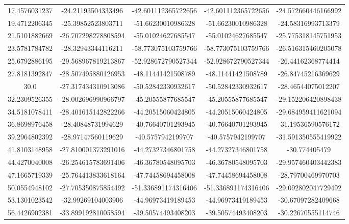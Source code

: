 \begin{table}[H]
\begin{tabular}{*{5}{S[table-auto-round, table-format=-2.2]}}
  17.4576031237 & -24.21193504333496 & -42.601112365722656 & -42.601112365722656 & -24.572660446166992 \tabularnewline

  19.4712206345 & -25.39852523803711 & -51.66230010986328 & -51.66230010986328 & -24.58316993713379 \tabularnewline

  21.5101882669 & -26.707298278808594 & -55.01024627685547 & -55.01024627685547 & -25.775318145751953 \tabularnewline

  23.5781784782 & -28.32943344116211 & -58.773075103759766 & -58.773075103759766 & -26.516315460205078 \tabularnewline

  25.6792886195 & -29.568967819213867 & -52.928672790527344 & -52.928672790527344 & -26.44162368774414 \tabularnewline

  27.8181392847 & -28.507495880126953 & -48.11441421508789 & -48.11441421508789 & -26.84745216369629 \tabularnewline

  30.0 & -27.317434310913086 & -50.52842330932617 & -50.52842330932617 & -28.46544075012207 \tabularnewline

  32.2309526355 & -28.002696990966797 & -45.20555877685547 & -45.20555877685547 & -29.152206420898438 \tabularnewline

  34.5181078411 & -28.401615142822266 & -44.20515060424805 & -44.20515060424805 & -29.684959411621094 \tabularnewline

  36.8698976458 & -28.40848731994629 & -40.76640701293945 & -40.76640701293945 & -31.19536590576172 \tabularnewline

  39.2964802392 & -28.97147560119629 & -40.5757942199707 & -40.5757942199707 & -31.591350555419922 \tabularnewline

  41.8103148958 & -27.810001373291016 & -44.27327346801758 & -44.27327346801758 & -30.774405479 \tabularnewline

  44.4270040008 & -26.254615783691406 & -46.36780548095703 & -46.36780548095703 & -29.957460403442383 \tabularnewline

  47.1665719339 & -25.764413833618164 & -47.74458694458008 & -47.74458694458008 & -28.79700469970703 \tabularnewline

  50.0554948102 & -27.705350875854492 & -51.336891174316406 & -51.336891174316406 & -29.092802047729492 \tabularnewline

  53.1301023542 & -32.99269104003906 & -44.96973419189453 & -44.96973419189453 & -30.67097282409668 \tabularnewline

  56.4426902381 & -33.899192810058594 & -39.50574493408203 & -39.50574493408203 & -30.22670555114746 \tabularnewline


\end{tabular}
\end{table}
